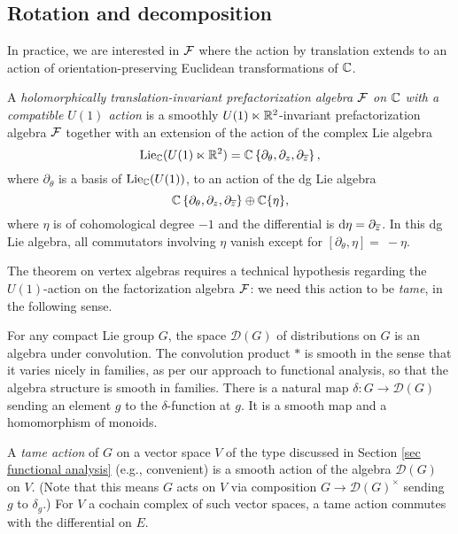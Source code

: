 \subsection{Rotation and decomposition}

In practice, we are interested in $\mathcal F$ where the action by translation extends to an action of orientation-preserving Euclidean transformations of $\mathbb C$.

\begin{dfn}
A \emph{holomorphically translation-invariant prefactorization algebra $\mathcal F$ on $\mathbb C$ with a compatible $U(1)$ action} 
is a smoothly $U(1) \ltimes \mathbb R^2$-invariant prefactorization algebra $\mathcal F$ 
together with an extension of the action of the complex Lie algebra 
$$
{\rm Lie}_{\mathbb C}(U(1) \ltimes \mathbb R^2) = \mathbb C\left\{ \partial_\theta, \partial_z, \partial_{\overline{z}} \right\},
$$
where $\partial_\theta$ is a basis of ${\rm Lie}_\mathbb C(U(1))$, to an action of the dg Lie algebra
$$
\mathbb C\left\{ \partial_\theta, \partial_z, \partial_{\overline{z}} \right\} \oplus \mathbb C\{\eta\} ,
$$
where $\eta$ is of cohomological degree $-1$ and the differential is ${\rm d} \eta = \partial_{\overline{z}}$.
In this dg Lie algebra, all commutators involving $\eta$ vanish except for $[\partial_\theta, \eta] =~-\eta$.
\end{dfn}

The theorem on vertex algebras requires a technical hypothesis regarding the $U(1)$-action on the factorization algebra $\mathcal F$:
we need this action to be {\em tame}, in the following sense. 

For any compact Lie group $G$, the space $\mathcal{D}(G)$ of distributions on $G$ is an algebra under convolution.  
The convolution product $\ast$ is smooth in the sense that it varies nicely in families, as per our approach to functional analysis,
so that the algebra structure is smooth in families.
There is a natural map $\delta: G \to \mathcal{D}(G)$
sending an element $g$ to the $\delta$-function at $g$.  
It is a smooth map and a homomorphism of monoids.  

\begin{dfn} 
A \emph{tame action} of $G$ on a vector space $V$ of the type discussed in Section \ref{sec functional analysis} (e.g., convenient) is a smooth action of the algebra $\mathcal{D}(G)$ on $V$.  
(Note that this means $G$ acts on $V$ via composition $G \to \mathcal{D}(G)^{\times}$ sending $g$ to $\delta_g$.)
For $V$ a cochain complex of such vector spaces, a tame action commutes with the differential on $E$. 
\end{dfn}

